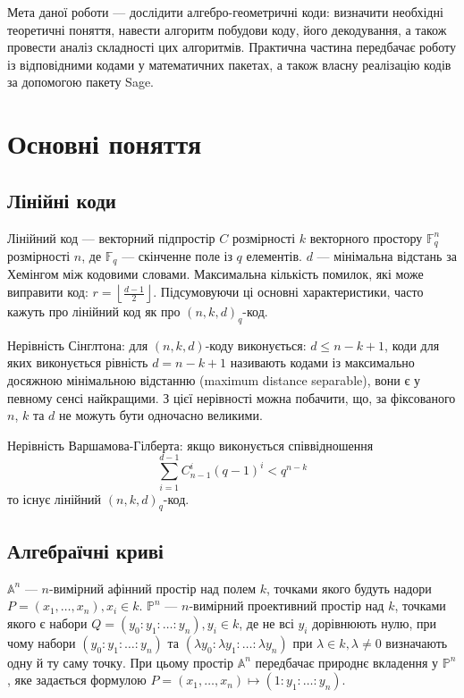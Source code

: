 \documentclass[a4paper,12pt,oneside]{article}
\begin{document}
Мета даної роботи --- дослідити алгебро-геометричні коди: визначити необхідні теоретичні поняття, навести алгоритм побудови коду, його декодування, а також провести аналіз складності цих алгоритмів. Практична частина передбачає роботу із відповідними кодами у математичних пакетах, а також власну реалізацію кодів за допомогою пакету Sage.

\pagebreak
\section{Основні поняття}

\subsection{Лінійні коди}
Лінійний код --- векторний підпростір $C$ розмірності $k$ векторного простору $\mathbb{F}_q^n$ розмірності $n$, де $\mathbb{F}_q$ --- скінченне поле із $q$ елементів. 
$d$ --- мінімальна відстань за Хемінгом між кодовими словами. Максимальна кількість помилок, які може виправити код: $r=\left \lfloor \frac{d-1}{2} \right \rfloor$. 
Підсумовуючи ці основні характеристики, часто кажуть про лінійний код як про $(n, k, d)_q$-код.

Нерівність Сінглтона: для $(n, k, d)$-коду виконується: $d \le n-k+1$, 
коди для яких виконується рівність $d = n-k+1$ називають кодами із максимально досяжною мінімальною відстанню (maximum distance separable), вони є у певному сенсі найкращими. 
З цієї нерівності можна побачити, що, за фіксованого $n$, $k$ та $d$ не можуть бути одночасно великими.

Нерівність Варшамова-Гілберта: якщо виконується співвідношення 
$$\sum_{i=1}^{d-1} C_{n-1}^i (q-1)^i < q^{n-k}$$
то існує лінійний $(n, k ,d)_q$-код.


\subsection{Алгебраїчні криві}
$\mathbb{A}^n$ --- $n$-вимірний афінний простір над полем $k$, точками якого будуть надори $P = (x_1, \dots, x_n), x_i \in k$. 
$\mathbb{P}^n$ --- $n$-вимірний проективний простір над $k$, точками якого є набори $Q=(y_0 : y_1 : \ldots : y_n), y_i \in k$, де не всі $y_i$ дорівнюють нулю,
при чому набори $(y_0 : y_1 : \ldots : y_n)$ та $(\lambda y_0 : \lambda y_1 : \ldots : \lambda y_n)$ при $\lambda \in k, \lambda \neq 0$ визначають одну й ту саму точку. 
При цьому простір $\mathbb{A}^n$ передбачає природнє вкладення у $\mathbb{P}^n$, яке задається формулою $P = (x_1, \dots, x_n) \mapsto (1: y_1 : \ldots : y_n)$.
\end{document}
